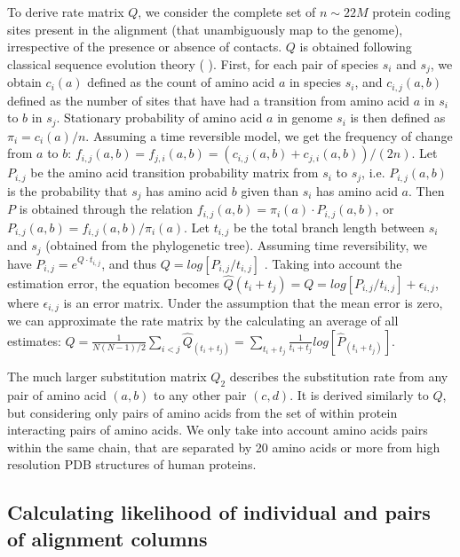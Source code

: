 To derive rate matrix $Q$, we consider the complete set of $n \sim22M$ protein coding sites present in the alignment (that unambiguously map to the genome), irrespective of the presence or absence of contacts. $Q$ is obtained following classical sequence evolution theory (\cite{yang2006computational} \cite{felsenstein2004inferring}). First, for each pair of species  $s_i$ and $s_j$, we obtain $c_i(a)$ defined as the count of amino acid $a$ in species $s_i$, and $c_{i,j}(a,b)$ defined as the number of sites that have had a transition from amino acid $a$ in $s_i$ to $b$ in $s_j$. Stationary probability of amino acid $a$ in genome $s_i$ is then defined as $\pi_i = c_i(a)/n$. Assuming a time reversible model, we get the frequency of change from $a$ to $b$: $f_{i,j}(a,b) = f_{j,i}(a,b) = (c_{i,j}(a,b) + c_{j,i}(a,b))/(2n)$. Let $P_{i,j}$ be the amino acid transition probability matrix from $s_i$ to $s_j$, i.e. $P_{i,j}(a,b)$ is the probability that $s_j$ has amino acid $b$ given than $s_i$ has amino acid $a$. Then $P$ is obtained through the relation $f_{i,j}(a,b) = \pi_i(a) \cdot P_{i,j}(a,b)$, or $P_{i,j}(a,b) =   f_{i,j}(a,b) /  \pi_i(a)$.  Let $t_{i,j}$ be the total branch length between $s_i$ and $s_j$ (obtained from the phylogenetic tree). Assuming time reversibility, we have $P_{i,j} = e^{Q \cdot t_{i,j}}$, and thus $Q=log[ P_{i,j} / t_{i,j} ]$ \cite{yang2006computational}. Taking into account the estimation error, the equation becomes $\hat{Q}(t_i+t_j) = Q = log[ P_{i,j} / t_{i,j} ] + \epsilon_{i,j}$, where $\epsilon_{i,j}$ is an error matrix. Under the assumption that the mean error is zero, we can approximate the rate matrix by the calculating an average of all estimates: $\hat{Q} = \frac{1}{N(N-1)/2} \sum_{i < j} \hat{Q}_(t_i+t_j) = \sum_{t_i+t_j} \frac{1}{t_i+t_j} log[ \hat{P}_(t_i+t_j) ]$.

The much larger substitution matrix $Q_2$ describes the substitution rate from any pair of amino acid $(a,b)$ to any other pair $(c,d)$. It is derived similarly to $Q$, but considering only pairs of amino acids from the set of within protein interacting pairs of amino acids. We only take into account amino acids pairs within the same chain, that are separated by 20 amino acids or more from high resolution PDB structures of human proteins. 

\subsection{Calculating likelihood of individual and pairs of alignment columns}

